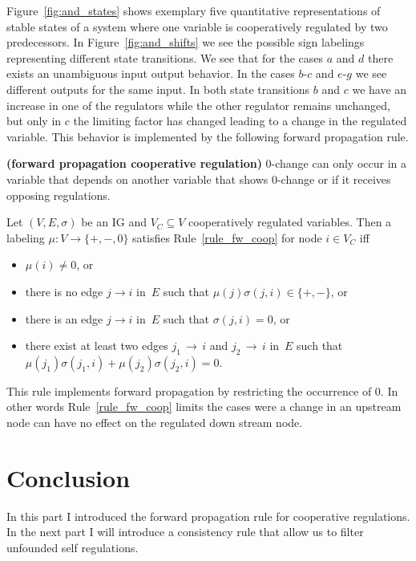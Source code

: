 Figure~\ref{fig:and_states} shows exemplary five quantitative representations of stable states of 
 a system where one variable is cooperatively regulated by two predecessors.
In Figure~\ref{fig:and_shifts} we see the possible sign labelings representing different state transitions.
%
We see that for the cases $a$ and $d$ there exists an unambiguous input output behavior.
In the cases $b$-$c$ and $e$-$g$ we see different outputs for the same input.
In both state transitions $b$ and $c$ we have an increase in one of the regulators while the other regulator remains unchanged,
 but only in $c$ the limiting factor has changed leading to a change in the regulated variable.
This behavior is implemented by the following forward propagation rule.
%
\begin{srule}\label{rule_fw_coop}{\bf (forward propagation cooperative regulation)} 
0-change can only occur in a variable that depends on another variable that shows 0-change
 or if it receives opposing regulations.

Let $(V,E,\sigma)$ be an IG and $V_C \subseteq V$ cooperatively regulated variables.
Then a labeling $\mu : V \rightarrow \{\plus,\minus,0\}$ satisfies Rule~\ref{rule_fw_coop} for node $i \in V_C$
 iff
 \begin{itemize}
  \item $\mu(i) \neq 0$, or
  \item there is no edge $j \rightarrow i$ in~$E$ such that $\mu(j)\sigma(j,i) \in \{\plus,\minus\}$, or
  \item there is an edge $j \rightarrow i$ in~$E$ such that $\sigma(j,i)= 0$, or
  \item there exist at least two edges $j_1 {\,\rightarrow\,} i$ and $j_2 {\,\rightarrow\,} i$ in~$E$
 such that $\mu(j_1)\sigma(j_1,i) + \mu(j_2)\sigma(j_2,i) = 0$. 
 \end{itemize}
\end{srule}
This rule implements forward propagation by restricting the occurrence of $0$.
In other words Rule~\ref{rule_fw_coop} limits the cases were a change in an upstream node can have no effect
 on the regulated down stream node.

\section*{Conclusion} 

In this part I introduced the forward propagation rule for cooperative regulations.
In the next part I will introduce a consistency rule that allow us to filter unfounded self regulations.